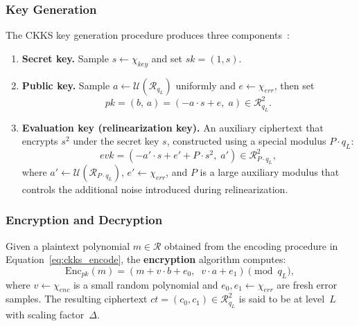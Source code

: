 \subsubsection{Key Generation}

The CKKS key generation procedure produces three components~\cite{cheon2017homomorphic}:

\begin{enumerate}
    \item \textbf{Secret key.} Sample $s \leftarrow \chi_{\mathit{key}}$ and set $\mathit{sk} = (1, s)$.
    \item \textbf{Public key.} Sample $a \leftarrow \mathcal{U}(\mathcal{R}_{q_L})$ uniformly and $e \leftarrow \chi_{\mathit{err}}$, then set
    \begin{equation}
        \mathit{pk} = \left(b,\, a\right) = \left(-a \cdot s + e,\; a\right) \in \mathcal{R}_{q_L}^2.
        \label{eq:ckks_pk}
    \end{equation}
    \item \textbf{Evaluation key (relinearization key).} An auxiliary ciphertext that encrypts $s^2$ under the secret key $s$, constructed using a special modulus $P \cdot q_L$:
    \begin{equation}
        \mathit{evk} = \left(-a' \cdot s + e' + P \cdot s^2,\; a'\right) \in \mathcal{R}_{P \cdot q_L}^2,
        \label{eq:ckks_evk}
    \end{equation}
    where $a' \leftarrow \mathcal{U}(\mathcal{R}_{P \cdot q_L})$, $e' \leftarrow \chi_{\mathit{err}}$, and $P$ is a large auxiliary modulus that controls the additional noise introduced during relinearization.
\end{enumerate}

\subsubsection{Encryption and Decryption}

Given a plaintext polynomial $m \in \mathcal{R}$ obtained from the encoding procedure in Equation~\eqref{eq:ckks_encode}, the \textbf{encryption} algorithm computes:
\begin{equation}
    \mathrm{Enc}_{\mathit{pk}}(m) = \left(m + v \cdot b + e_0,\;\; v \cdot a + e_1\right) \pmod{q_L},
    \label{eq:ckks_enc}
\end{equation}
where $v \leftarrow \chi_{\mathit{enc}}$ is a small random polynomial and $e_0, e_1 \leftarrow \chi_{\mathit{err}}$ are fresh error samples. The resulting ciphertext $\mathit{ct} = (c_0, c_1) \in \mathcal{R}_{q_L}^2$ is said to be at level~$L$ with scaling factor~$\Delta$.

